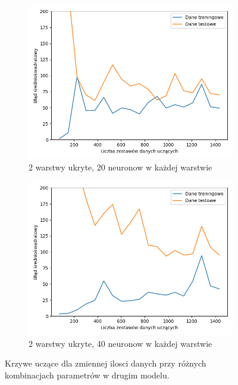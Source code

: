 \documentclass[12pt]{aghdpl}
\begin{document}
\begin{figure}[h]
		 	\begin{subfigure}{.5\linewidth}
		 		\includegraphics[width =\linewidth]{wykresy/4_zwiekszenie_stopnia_skomplikowania_modelu/2_warstwy_20_neuronow_learning_curves.png}
		 		\caption{2 warstwy ukryte, 20 neuronow w każdej warstwie}
		 	\end{subfigure}
		 	\begin{subfigure}{.5\linewidth}
		 		\includegraphics[width =\linewidth]{wykresy/4_zwiekszenie_stopnia_skomplikowania_modelu/2_warstwy_40_neuronow_learning_curves.png}
		 		\caption{2 warstwy ukryte, 40 neuronow w każdej warstwie}
		 	\end{subfigure}
	 	
 			\caption{Krzywe uczące dla zmiennej ilosci danych przy różnych kombinacjach parametrów w drugim modelu.}
			\label{fig: drugi_model_kombinacje_parametrow_learning_curves}
		\end{figure}
		
\end{document}
